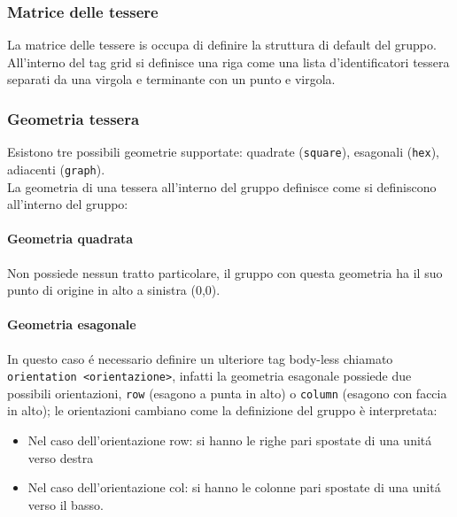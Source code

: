 \subsubsection{Matrice delle tessere}
La matrice delle tessere is occupa di definire la struttura di default del gruppo. \\
All'interno del tag grid si definisce una riga come una lista d'identificatori tessera
separati da una virgola e terminante con un punto e virgola.

\subsubsection{Geometria tessera}
Esistono tre possibili geometrie supportate: quadrate (\lstinline|square|), 
esagonali (\lstinline|hex|), adiacenti (\lstinline|graph|). \\
La geometria di una tessera all'interno del gruppo definisce come si definiscono all'interno del gruppo:

\paragraph{Geometria quadrata}
Non possiede nessun tratto particolare, 
il gruppo con questa geometria ha il suo punto di origine in alto a sinistra (0,0). 

\paragraph{Geometria esagonale}
In questo caso é necessario definire un ulteriore tag body-less chiamato \lstinline|orientation <orientazione>|,
infatti la geometria esagonale possiede due possibili orientazioni, \lstinline|row| (esagono a punta in alto) 
o \lstinline|column| (esagono con faccia in alto); 
le orientazioni cambiano come la definizione del gruppo è interpretata:
\begin{itemize}
    \item Nel caso dell'orientazione row: si hanno le righe pari spostate di una unitá verso destra
    \item Nel caso dell'orientazione col: si hanno le colonne pari spostate di una unitá verso il basso.
\end{itemize}

\begin{figure}[ht]
\begin{center}
\end{center}    
\end{figure}

